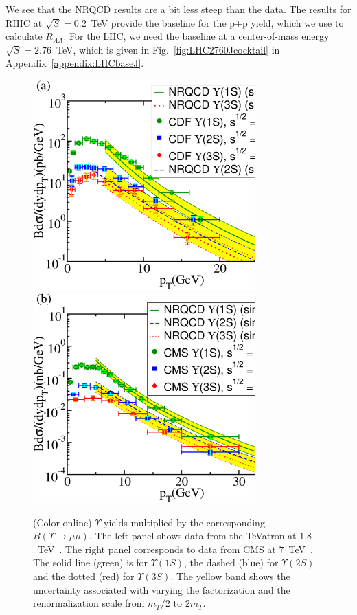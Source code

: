 \documentclass[article,showpacs,preprintnumbers,amsmath,amssymb]{revtex4}
\begin{document}
We see that the NRQCD results are a bit less steep than the data. The results
for RHIC at $\sqrt{S}=0.2$~TeV provide the baseline for the p$+$p yield, which
we use to calculate $R_{AA}$. For the LHC, we need the baseline at a
center-of-mass energy $\sqrt{S}=2.76$~TeV, which is given in
Fig.~\ref{fig:LHC2760Jcocktail} in Appendix~\ref{appendix:LHCbaseJ}.

\begin{figure}[!ht]
\vspace*{.2in}
\includegraphics[width=3.38in,angle=0]{fig4_cdf1800ppupsilon.eps} 
\includegraphics[width=3.38in,angle=0]{fig5_lhc7000ppupsilon.eps}
\caption{(Color online) $\Upsilon$ yields multiplied by the corresponding
$B(\Upsilon\rightarrow\mu\mu)$. The left panel shows data from the TeVatron at
$1.8$~TeV~\cite{Acosta:2001gv}.  The right panel corresponds to data from CMS
at $7$~TeV~\cite{Khachatryan:2010zg}. The solid line (green) is for
$\Upsilon(1S)$, the dashed (blue) for $\Upsilon(2S)$ and the dotted (red) for
$\Upsilon(3S) $. The yellow band shows the uncertainty associated with varying
the factorization and the renormalization scale from $m_T/2$ to
$2m_T$.~\label{fig:Uyields}}
\end{figure}
\end{document}
